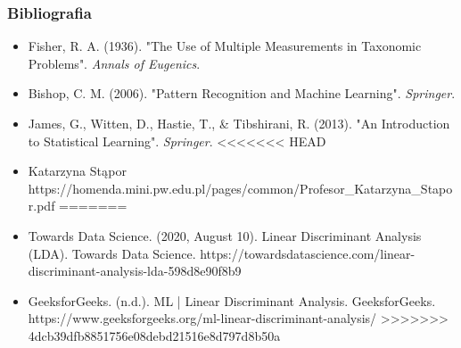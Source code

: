 \documentclass{beamer}
\begin{document}
\begin{frame}
    \frametitle{Bibliografia}
    \begin{itemize}
        \item Fisher, R. A. (1936). "The Use of Multiple Measurements in Taxonomic Problems". \textit{Annals of Eugenics}.
        \item Bishop, C. M. (2006). "Pattern Recognition and Machine Learning". \textit{Springer}.
        \item James, G., Witten, D., Hastie, T., \& Tibshirani, R. (2013). "An Introduction to Statistical Learning". \textit{Springer}.
<<<<<<< HEAD
        \item Katarzyna Stąpor  https://homenda.mini.pw.edu.pl/pages/common/Profesor_Katarzyna_Stapor.pdf
=======
        \item Towards Data Science. (2020, August 10). Linear Discriminant Analysis (LDA). Towards Data Science. https://towardsdatascience.com/linear-discriminant-analysis-lda-598d8e90f8b9
        \item GeeksforGeeks. (n.d.). ML | Linear Discriminant Analysis. GeeksforGeeks. https://www.geeksforgeeks.org/ml-linear-discriminant-analysis/
>>>>>>> 4dcb39dfb8851756e08debd21516e8d797d8b50a
    \end{itemize}
\end{frame}
\end{document}
